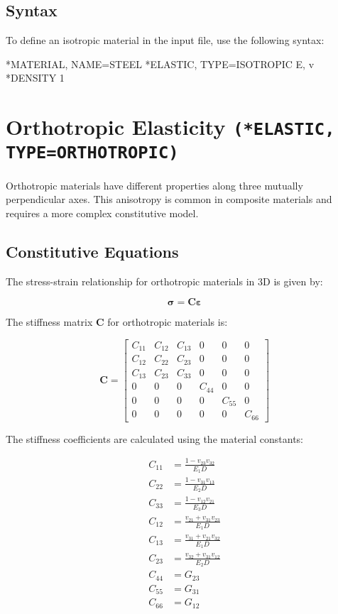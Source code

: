 \subsection{Syntax}

To define an isotropic material in the input file, use the following syntax:

\begin{codeBlock}
*MATERIAL, NAME=STEEL
*ELASTIC, TYPE=ISOTROPIC
E, v
*DENSITY
1
\end{codeBlock}

\section{Orthotropic Elasticity \texttt{(*ELASTIC, TYPE=ORTHOTROPIC)}}

Orthotropic materials have different properties along three mutually perpendicular axes. This anisotropy is common in composite materials and requires a more complex constitutive model.

\subsection{Constitutive Equations}

The stress-strain relationship for orthotropic materials in 3D is given by:

\[
\boldsymbol{\sigma} = \mathbf{C} \boldsymbol{\varepsilon}
\]

The stiffness matrix $\mathbf{C}$ for orthotropic materials is:

\[
\mathbf{C} =
\begin{bmatrix}
C_{11} & C_{12} & C_{13} & 0      & 0      & 0 \\
C_{12} & C_{22} & C_{23} & 0      & 0      & 0 \\
C_{13} & C_{23} & C_{33} & 0      & 0      & 0 \\
0      & 0      & 0      & C_{44} & 0      & 0 \\
0      & 0      & 0      & 0      & C_{55} & 0 \\
0      & 0      & 0      & 0      & 0      & C_{66}
\end{bmatrix}
\]

The stiffness coefficients are calculated using the material constants:

\[
\begin{aligned}
C_{11} &= \frac{1 - v_{23} v_{32}}{E_1 D} \\
C_{22} &= \frac{1 - v_{31} v_{13}}{E_2 D} \\
C_{33} &= \frac{1 - v_{12} v_{21}}{E_3 D} \\
C_{12} &= \frac{v_{21} + v_{31} v_{23}}{E_1 D} \\
C_{13} &= \frac{v_{31} + v_{21} v_{32}}{E_1 D} \\
C_{23} &= \frac{v_{32} + v_{31} v_{12}}{E_2 D} \\
C_{44} &= G_{23} \\
C_{55} &= G_{31} \\
C_{66} &= G_{12}
\end{aligned}
\]

